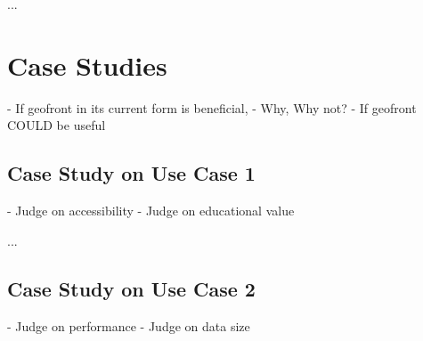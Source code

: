 ...

\section{ Case Studies } 
- If geofront in its current form is beneficial,
  - Why, Why not?
- If geofront COULD be useful

\subsection{Case Study on Use Case 1}%
- Judge on accessibility
- Judge on educational value

...

\subsection{Case Study on Use Case 2}%
- Judge on performance
- Judge on data size

